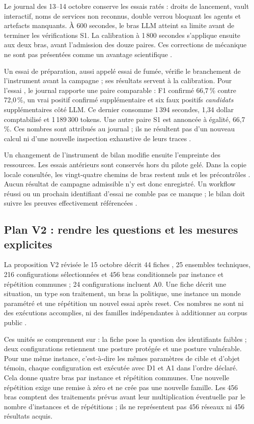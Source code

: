 \documentclass[11pt,a4paper]{article}
\DeclareRobustCommand{\code}[1]{{\small\path{#1}}}
\begin{document}
Le journal des 13--14 octobre conserve les essais ratés : droits de lancement,
vault interactif, noms de services non reconnus, double verrou bloquant les
agents et artefacts manquants. À 600 secondes, le bras LLM atteint sa limite
avant de terminer les vérifications S1. La calibration à 1\,800 secondes
s'applique ensuite aux deux bras, avant l'admission des douze paires.
Ces corrections de mécanique ne sont pas présentées comme un avantage
scientifique \cite{bench-preflight}.

Un essai de préparation, aussi appelé essai de fumée, vérifie le branchement
de l'instrument avant la campagne ; ses résultats servent à la calibration.
Pour l'essai \code{38549458127}, le journal rapporte une paire comparable :
F1 confirmé 66,7\,\% contre 72,0\,\%, un vrai positif confirmé supplémentaire
et six faux positifs \emph{candidats} supplémentaires côté LLM.
Ce dernier consomme 1\,394 secondes, 1,34 dollar comptabilisé et
1\,189\,300 tokens. Une autre paire S1 est annoncée à égalité, 66,7\,\%.
Ces nombres sont attribués au journal ; ils ne résultent pas d'un nouveau
calcul ni d'une nouvelle inspection exhaustive de leurs traces
\cite{bench-preflight}.

Un changement de l'instrument de bilan modifie ensuite l'empreinte des
ressources. Les essais antérieurs sont conservés hors du pilote gelé.
Dans la copie locale consultée, les vingt-quatre chemins de bras restent
nuls et les précontrôles \code{pending}. Aucun résultat de campagne admissible
n'y est donc enregistré. Un workflow réussi ou un prochain identifiant
d'essai ne comble pas ce manque ; le bilan doit suivre les preuves effectivement
référencées \cite{bench-pilote,bench-preflight}.

\subsection{Plan V2 : rendre les questions et les mesures explicites}

La proposition V2 révisée le 15 octobre décrit 44 fiches
\code{s_...}, 25 ensembles techniques, 216 configurations sélectionnées et
456 bras conditionnels par instance et répétition communes ; 24 configurations
incluent A0. Une fiche décrit une situation, un type son traitement, un bras
la politique, une instance un monde paramétré et une répétition un nouvel
essai après reset. Ces nombres ne sont ni des exécutions accomplies, ni des
familles indépendantes à additionner au corpus public \cite{bench-v2}.

Ces unités se comprennent sur \code{s_ssh_identifiants} : la fiche pose la
question des identifiants faibles ; deux configurations retiennent une posture
protégée et une posture vulnérable. Pour une même instance, c'est-à-dire les
mêmes paramètres de cible et d'objet témoin, chaque configuration est exécutée
avec D1 et A1 dans l'ordre déclaré. Cela donne quatre bras par instance et
répétition communes. Une nouvelle répétition exige une remise à zéro et ne crée
pas une nouvelle famille. Les 456 bras comptent des traitements prévus avant
leur multiplication éventuelle par le nombre d'instances et de répétitions ;
ils ne représentent pas 456 réseaux ni 456 résultats acquis.
\end{document}
